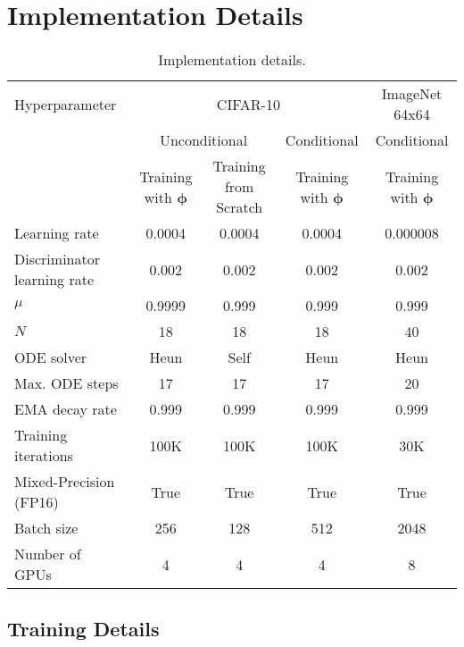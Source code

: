 \documentclass{article} \usepackage{iclr2024_coNFErence,times}
\theoremstyle{definition}
\theoremstyle{remark}
\begin{document}
\section{Implementation Details}\label{sec:implementation}

\begin{table}[t]
	\caption{Implementation details.}
	\label{tab:implementation}
	\scriptsize
	\centering
	\begin{tabular}{lcccc}
		\toprule
		Hyperparameter & \multicolumn{3}{c}{CIFAR-10} & ImageNet 64x64 \\\cmidrule(lr){2-4}\cmidrule(lr){5-5}
        & \multicolumn{2}{c}{Unconditional} & Conditional & Conditional \\\cmidrule(lr){2-3}\cmidrule(lr){4-4}\cmidrule(lr){5-5}
        & Training with $\bm{\phi}$ & Training from Scratch & Training with $\bm{\phi}$ & Training with $\bm{\phi}$ \\\cmidrule(lr){1-1}\cmidrule(lr){2-2}\cmidrule(lr){3-3}\cmidrule(lr){4-4}\cmidrule(lr){5-5}
        Learning rate & 0.0004 & 0.0004 & 0.0004 & 0.000008 \\
        Discriminator learning rate & 0.002 & 0.002 & 0.002 & 0.002 \\
        $\mu$ & 0.9999 & 0.999 & 0.999 & 0.999 \\
        $N$ & 18 & 18 & 18 & 40 \\
        ODE solver & Heun & Self & Heun & Heun \\
        Max. ODE steps & 17 & 17 & 17 & 20 \\
        EMA decay rate & 0.999 & 0.999 & 0.999 & 0.999 \\
        Training iterations & 100K & 100K & 100K & 30K \\
        Mixed-Precision (FP16) & True & True & True & True \\
        Batch size & 256 & 128 & 512 & 2048 \\
        Number of GPUs & 4 & 4 & 4 & 8 \\
            \bottomrule
	\end{tabular}
\end{table}

\subsection{Training Details}\label{appendix:training_details}
\end{document}
